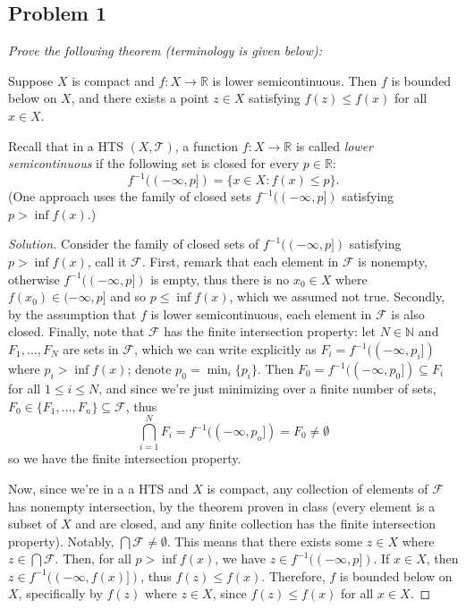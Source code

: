 \documentclass{article}
\newcommand{\N}{{\mathbb N}}
\newcommand{\R}{{\mathbb R}}
\begin{document}
\subsection*{Problem 1}
{\it Prove the following theorem (terminology is given below):
\begin{center}
	Suppose $X$ is compact and $f \colon X \to \R$ is lower semicontinuous.
	Then $f$ is bounded below on $X$,
	and there exists a point $z \in X$ satisfying $f(z) \leq f(x)$ for all $x \in X$.
\end{center}
Recall that in a HTS $(X, \mathcal{T})$, a function $f \colon X \to \R$
is called \emph{lower semicontinuous} if the following set
is closed for every $p \in \R$:
\[
	f^{-1}((-\infty,p]) = \{x \in X \colon f(x) \leq p \}.
\]
(One approach uses the family of closed sets
$f^{-1}((-\infty,p])$ satisfying $p > \inf f(x)$.)}

\begin{proof}[Solution]\let\qed\relax
	Consider the family of closed sets of $f^{-1}((-\infty,p])$
	satisfying $p > \inf{f(x)}$, call it $\mathcal{F}$.
	First, remark that each element in $\mathcal{F}$ is nonempty,
	otherwise $f^{-1}((-\infty,p])$ is empty,
	thus there is no $x_0 \in X$ where $f(x_0) \in (-\infty,p]$
	and so $p \leq \inf{f(x)}$, which we assumed not true.
	Secondly, by the assumption that $f$ is lower semicontinuous,
	each element in $\mathcal{F}$ is also closed.
	Finally, note that $\mathcal{F}$ has the finite intersection property:
	let $N \in \N$ and $F_1, \dots, F_N$ are sets in $\mathcal{F}$,
	which we can write explicitly as $F_i = f^{-1}((-\infty, p_i])$
	where $p_i > \inf{f(x)}$;
	denote $p_0 = \min_i\{p_i\}$.
	Then $F_0 = f^{-1}((-\infty, p_0]) \subseteq F_i$ for all $1 \leq i \leq N$,
	and since we're just minimizing over a finite number of sets,
	$F_0 \in \{F_1,\dots,F_n\} \subseteq \mathcal{F}$, thus
	\[
		\bigcap_{i=1}^N F_i = f^{-1}((-\infty,p_o]) = F_0 \neq \emptyset
	\]
	so we have the finite intersection property.

	Now, since we're in a a HTS and $X$ is compact,
	any collection of elements of $\mathcal{F}$ has nonempty intersection,
	by the theorem proven in class
	(every element is a subset of $X$ and are closed,
	and any finite collection has the finite intersection property).
	Notably, $\bigcap \mathcal{F} \neq \emptyset$.
	This means that there exists some $z \in X$ where $z \in \bigcap\mathcal{F}$.
	Then, for all $p > \inf{f(x)}$, we have $z \in f^{-1}((-\infty,p])$.
	If $x \in X$, then $z \in f^{-1}((-\infty,f(x)])$, thus $f(z) \leq f(x)$.
	Therefore, $f$ is bounded below on $X$, specifically
	by $f(z)$ where $z \in X$,
	since $f(z) \leq f(x)$ for all $x \in X$.
\end{proof}
\clearpage
~\clearpage
\end{document}
